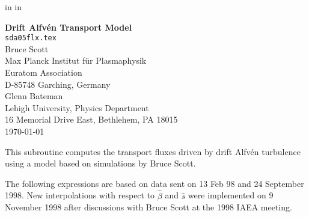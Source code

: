 
\headheight 0pt \headsep 0pt          
\topmargin 0pt   in
\oddsidemargin 0pt  in

\newcommand{\Partial}[2]{\frac{\partial #1}{\partial #2}}
\newcommand{\jacobian}{{\cal J}}



\begin{center} 
\large {\bf Drift Alfv\'{e}n Transport Model} \\
\normalsize  {\tt sda05flx.tex} \\
\vspace{1pc}
Bruce Scott \\
Max Planck Institut f\"{u}r Plasmaphysik \\
Euratom Association \\
D-85748 Garching, Germany \\
\vspace{1pc}
Glenn Bateman \\
Lehigh University, Physics Department \\
16 Memorial Drive East, Bethlehem, PA 18015 \\
\vspace{1pc}
\today
\end{center}

This subroutine computes the transport fluxes driven by
drift Alfv\'{e}n turbulence using a model based on
simulations by Bruce Scott.

The following expressions are based on data sent on 13 Feb 98
and 24 September 1998.
New interpolations with respect to $\hat{\beta}$ and $\hat{s}$
were implemented on 9 November 1998 after discussions with
Bruce Scott at the 1998 IAEA meeting.

